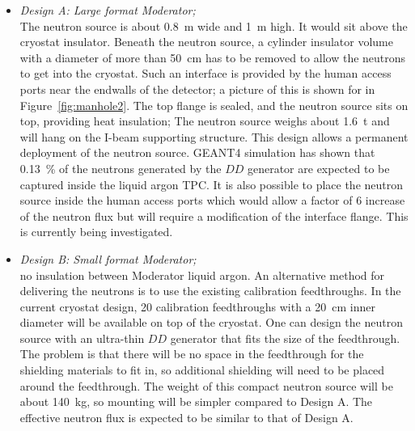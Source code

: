 \begin{itemize}
\item {\it Design A: Large format Moderator;} \\
The neutron source is about \SI{0.8}{\m} wide and \SI{1}{\m} high. It would sit above the cryostat insulator. Beneath the neutron source, a cylinder insulator volume with a diameter of more than \SI{50}{\cm} has to be removed to allow the neutrons to get into the cryostat. Such an interface is provided by the human access ports near the endwalls of the detector; a picture of this is shown for  in Figure~\ref{fig:manhole2}. The top flange is sealed, and the neutron source sits on top, 
providing heat insulation; The neutron source weighs about \SI{1.6}{\tonne} and will hang on the I-beam supporting structure. This design allows a permanent deployment of the neutron source. GEANT4 simulation has shown that \SI{0.13}{\%} of the neutrons generated by the $DD$ generator are expected to be captured inside the liquid argon TPC. It is also possible to place the neutron source inside the human access ports which would allow a factor of \num{6} increase of the neutron flux but will require a modification of the interface flange. This is currently being investigated.

\item {\it Design B: Small format Moderator;}\\
no insulation between Moderator liquid argon. An alternative method for delivering the neutrons is to use the existing calibration feedthroughs. In the current cryostat design, \num{20} calibration feedthroughs with a \SI{20}{\cm} inner diameter will be available on top of the cryostat. One can design the neutron source with an ultra-thin $DD$ generator that fits the size of the feedthrough. The problem is that there will be no space in the feedthrough for the shielding materials to fit in, so additional shielding will need to be placed around the feedthrough. The weight of this compact neutron source will be about \SI{140}{\kg}, so mounting will be simpler compared to Design A. The effective neutron flux is expected to be similar to that of Design A. 
\end{itemize}


